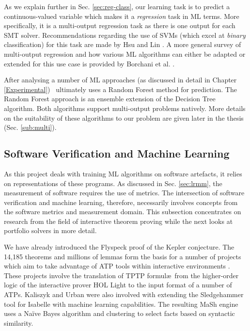 \sloppypar
As we explain further in Sec. \ref{sec:reg-class}, our learning task is to predict a continuous-valued variable which makes it a \textit{regression} task in ML terms. 
More specifically, it is a multi-output regression task as there is one output for each SMT solver. 
Recommendations regarding the use of SVMs (which excel at \textit{binary} classification) for this task are made by Hsu and Lin \cite{MulticlassSVM}. 
A more general survey of multi-output regression and how various ML algorithms can either be adapted or extended for this use case is provided by Borchani et al. \cite{multisurvey}. 

After analysing a number of ML approaches (as discussed in detail in Chapter \ref{Experimental}) \where~ultimately uses a Random Forest \cite{RandomForests} method for prediction. The Random Forest approach is an ensemble extension of the Decision Tree \cite{DecisionTrees} algorithm. Both algorithms support multi-output problems natively. More details on the suitability of these algorithms to our problem are given later in the thesis (Sec. \ref{sub:multi}). 


\subsection{Software Verification and Machine Learning}
\label{sub:lrsvml}

As this project deals with training ML algorithms on software artefacts, it relies on representations of these programs. As discussed in Sec. \ref{sec:lrmm}, the measurement of software requires the use of metrics. The intersection of software verification and machine learning, therefore, necessarily involves concepts from the software metrics and measurement domain. This subsection concentrates on research from the field of interactive theorem proving while the next looks at portfolio solvers in more detail.

We have already introduced the Flyspeck \cite{hales-kepler} proof of the Kepler conjecture. The 14,185 theorems and millions of lemmas form the basis for a number of projects which aim to take advantage of ATP tools within interactive environments \cite{Flyspec, Kaliszyk2015109}. These projects involve the translation of TPTP formul\ae~from the higher-order logic of the  interactive prover \textsf{HOL Light} to the input format of a number of ATPs. Kaliszyk and Urban were also involved with extending the Sledgehammer \cite{threeyears} tool for Isabelle \cite{Isabelle} with machine learning capabilities. The resulting MaSh \cite{Sledgehammer} engine uses a Na{\"i}ve Bayes algorithm and clustering to select facts based on syntactic similarity.       


